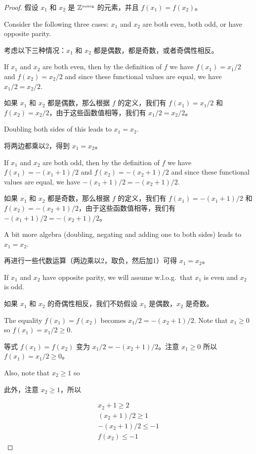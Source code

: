 \begin{proof}
假设 $x_1$ 和 $x_2$ 是 ${\mathbb Z}^{\mbox{\tiny noneg}}$ 的元素，并且 $f(x_1)=f(x_2)$。

Consider the following three cases: $x_1$ and $x_2$
are both even, both odd, or have opposite parity.

考虑以下三种情况：$x_1$ 和 $x_2$ 都是偶数，都是奇数，或者奇偶性相反。

If $x_1$ and $x_2$ are both even, then by the definition of $f$ we
have $f(x_1) = x_1/2$ and $f(x_2) = x_2/2$ and since these functional
values are equal, we have $x_1/2 = x_2/2$.

如果 $x_1$ 和 $x_2$ 都是偶数，那么根据 $f$ 的定义，我们有 $f(x_1) = x_1/2$ 和 $f(x_2) = x_2/2$，由于这些函数值相等，我们有 $x_1/2 = x_2/2$。

Doubling both sides of this
leads to $x_1=x_2$.

将两边都乘以2，得到 $x_1=x_2$。

If $x_1$ and $x_2$ are both odd, then by the definition of $f$ we
have $f(x_1) = -(x_1+1)/2$ and $f(x_2) = -(x_2+1)/2$ and since these functional
values are equal, we have $-(x_1+1)/2 = -(x_2+1)/2$.

如果 $x_1$ 和 $x_2$ 都是奇数，那么根据 $f$ 的定义，我们有 $f(x_1) = -(x_1+1)/2$ 和 $f(x_2) = -(x_2+1)/2$，由于这些函数值相等，我们有 $-(x_1+1)/2 = -(x_2+1)/2$。

A bit more
algebra (doubling, negating and adding one to both sides) leads to 
$x_1=x_2$.

再进行一些代数运算（两边乘以2，取负，然后加1）可得 $x_1=x_2$。

If $x_1$ and $x_2$ have opposite parity, we will assume w.l.o.g.\ that 
$x_1$ is even and $x_2$ is odd.

如果 $x_1$ 和 $x_2$ 的奇偶性相反，我们不妨假设 $x_1$ 是偶数，$x_2$ 是奇数。

The equality $f(x_1)=f(x_2)$ becomes
$x_1/2 = -(x_2+1)/2$.  Note that $x_1 \geq 0$ so $f(x_1) = x_1/2 \geq 0$.

等式 $f(x_1)=f(x_2)$ 变为 $x_1/2 = -(x_2+1)/2$。注意 $x_1 \ge 0$ 所以 $f(x_1) = x_1/2 \ge 0$。

Also, note that $x_2 \geq 1$ so 

此外，注意 $x_2 \geq 1$，所以

\begin{gather*}
x_2 + 1 \geq 2 \\
(x_2+1)/2 \geq 1 \\
-(x_2+1)/2 \leq -1 \\
f(x_2) \leq -1
\end{gather*}


\end{proof}

